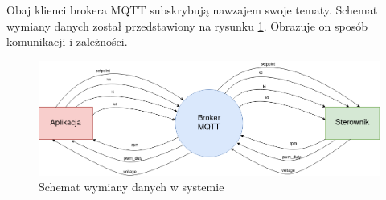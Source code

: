     Obaj klienci brokera MQTT subskrybują nawzajem swoje tematy. Schemat wymiany danych został przedstawiony na rysunku \ref{data_transmision}. Obrazuje on sposób komunikacji i zależności.
    

    \begin{figure}[ht]
      \centering
      \includegraphics[width=1\textwidth]{img/dane.png}
      \caption{Schemat wymiany danych w systemie}
      \label{data_transmision}
    \end{figure}